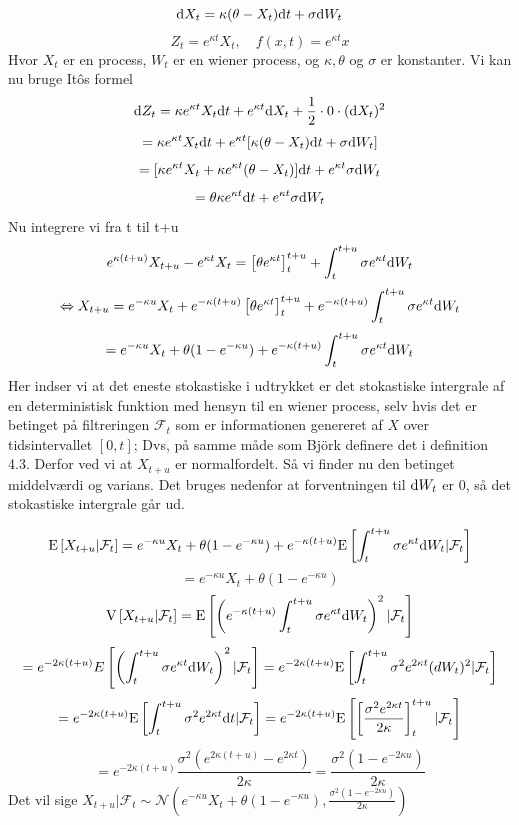 \documentclass{article}
\theoremstyle{definition}
\theoremstyle{remark}
\newcommand\ens{\Leftrightarrow}
\begin{document}
$$\text d X_t = \kappa(\theta - X_t)\text dt+\sigma \text dW_t$$
$$Z_t=e^{\kappa t}X_t,\quad f(x,t)= e^{\kappa t}x$$
Hvor $X_t$ er en process, $W_t$ er en wiener process, og $\kappa,\theta$ og $\sigma$ er konstanter. Vi kan nu bruge Itôs formel
$$\text dZ_t = \kappa e^{\kappa t}X_t\text dt + e^{\kappa t}\text dX_t +\frac12\cdot0\cdot(\text dX_t)^2$$
$$=\kappa e^{\kappa t}X_t\text dt + e^{\kappa t}[\kappa(\theta - X_t)\text dt +\sigma \text dW_t]$$
$$=[\kappa e^{\kappa t}X_t+\kappa e^{\kappa t}(\theta - X_t)]\text dt + e^{\kappa t}\sigma \text dW_t$$
$$=\theta\kappa e^{\kappa t}\text dt + e^{\kappa t}\sigma \text dW_t$$
Nu integrere vi fra t til t+u
$$e^{\kappa(t+u)}X_{t+u}-e^{\kappa t}X_t=\left[\theta e^{\kappa t}\right]_{t}^{t+u}+\int_{t}^{t+u}\sigma e^{\kappa t}\text d W_t$$
$$\ens X_{t+u}=e^{-\kappa u}X_t + e^{-\kappa(t+u)}\left[\theta e^{\kappa t}\right]_{t}^{t+u}+e^{-\kappa(t+u)}\int_{t}^{t+u}\sigma e^{\kappa t}\text d W_t$$
$$=e^{-\kappa u}X_t + \theta(1-e^{-\kappa u})+e^{-\kappa(t+u)}\int_{t}^{t+u}\sigma e^{\kappa t}\text d W_t$$
Her indser vi at det eneste stokastiske i udtrykket er det stokastiske intergrale af en deterministisk funktion med hensyn til en wiener process, selv hvis det er betinget på filtreringen $\mathcal F_t$ som er informationen genereret af $X$ over tidsintervallet $[0,t]$; Dvs, på samme måde som Björk definere det i definition 4.3. Derfor ved vi at $X_{t+u}$ er normalfordelt. Så vi finder nu den betinget middelværdi og varians. Det bruges nedenfor at forventningen til $\text dW_t$ er 0, så det stokastiske intergrale går ud.

$$\text E\left[X_{t+u}|\mathcal F_t\right] = e^{-\kappa u}X_t + \theta(1-e^{-\kappa u}) + e^{-\kappa(t+u)}\text E\left[\int_{t}^{t+u}\sigma e^{\kappa t}\text d W_t|\mathcal F_t\right]$$
$$=e^{-\kappa u}X_t + \theta(1-e^{-\kappa u})$$
$$\text V\left[X_{t+u}|\mathcal F_t\right]= \text E\left[\left(e^{-\kappa(t+u)}\int_{t}^{t+u}\sigma e^{\kappa t}\text d W_t\right)^2|\mathcal F_t\right]$$
$$= e^{-2\kappa(t+u)}E\left[\left(\int_{t}^{t+u}\sigma e^{\kappa t}\text d W_t\right)^2|\mathcal F_t\right]= e^{-2\kappa(t+u)}\text E \left[\int_{t}^{t+u}\sigma^2 e^{2\kappa t}\text (d W_t)^2|\mathcal F_t\right]$$
$$=e^{-2\kappa(t+u)}\text E \left[\int_{t}^{t+u}\sigma^2 e^{2\kappa t}\text dt|\mathcal F_t\right]=e^{-2\kappa(t+u)}\text E \left[\left[\frac{\sigma^2 e^{2\kappa t}}{2\kappa}\right]_{t}^{t+u}|\mathcal F_t\right]$$
$$=e^{-2\kappa(t+u)}\frac{\sigma^2 (e^{2\kappa (t+u)}-e^{2\kappa t})}{2\kappa}=\frac{\sigma^2 (1-e^{-2\kappa u})}{2\kappa}$$
Det vil sige $X_{t+u}|\mathcal F_t\sim\mathcal N\left(e^{-\kappa u}X_t + \theta(1-e^{-\kappa u}),\frac{\sigma^2 (1-e^{-2\kappa u})}{2\kappa}\right)$
\end{document}
